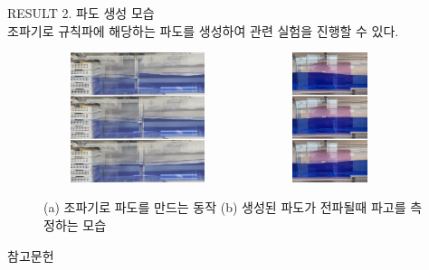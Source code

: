 \documentclass[a0paper,portrait]{baposter}
\begin{document}
\begin{poster}
\begin{posterbox}[name=result,column=2,below=wtank]{RESULT}
\small {2. 파도 생성 모습\\}
    \scriptsize{조파기로 규칙파에 해당하는 파도를 생성하여 관련 실험을 진행할 수 있다. }
\begin{figure}[H]
            \includegraphics[trim=0 0 0 0, clip, width=0.49\textwidth, 
                height=3.8cm,
                ]
                {images/vlcsnap-2023-06-29-10h35m08s932-1.png} 
            \includegraphics[trim=0 0 0 0, clip, width=0.49\textwidth, 
                height=3.8cm,
                ]
                {images/vlcsnap-2023-06-29-10h53m08s226-1.png} 
        \caption{(a) 조파기로 파도를 만드는 동작 (b) 생성된 파도가 전파될때 파고를 측정하는 모습}
        \label{result}   
    \end{figure}    
\end{posterbox}

\begin{posterbox}[name=refs,column=2,below=result,above=bottom]{참고문헌}
\tiny


\end{posterbox}

\end{poster}
\end{document}
